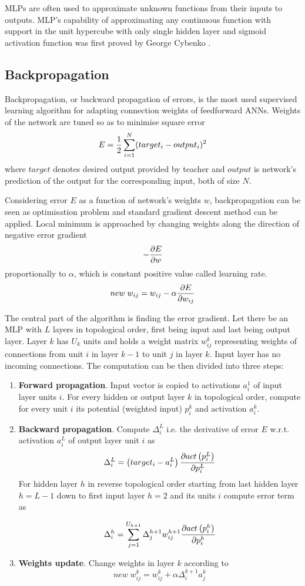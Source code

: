 \documentclass[12pt,oneside]{fithesis2}
\begin{document}
MLPs are often used to approximate unknown functions from their inputs to outputs. MLP's capability of approximating any continuous function with support in the unit hypercube with only single hidden layer and sigmoid activation function was first proved by George Cybenko \cite{universal-approx-theorem}.

\subsection{Backpropagation}
Backpropagation, or backward propagation of errors, is the most used supervised learning algorithm for adapting connection weights of feedforward ANNs. Weights of the network are tuned so as to minimise square error
$$E = {1 \over 2} \sum\limits_{i=1}^{N}(target_i - output_i)^2$$
where $target$ denotes desired output provided by teacher and $output$ is network's prediction of the output for the corresponding input, both of size $N$. \par
Considering error $E$ as a function of network's weights $w$, backpropagation can be seen as optimisation problem and standard gradient descent method can be applied. Local minimum is approached by changing weights along the direction of negative error gradient 
$$-{{\partial E} \over {\partial w}}$$
proportionally to $\alpha$, which is constant positive value called learning rate.
$$new \; w_{ij} = w_{ij} - \alpha {{\partial E} \over {\partial w_{ij}}}$$

The central part of the algorithm is finding the error gradient. Let there be an MLP with $L$ layers in topological order, first being input and last being output layer. Layer $k$ has $U_k$ units and holds a weight matrix $w_{ij}^k$ representing weights of connections from unit $i$ in layer $k - 1$ to unit $j$ in layer $k$. Input layer has no incoming connections. The computation can be then divided into three steps:

\begin{enumerate}
  \item \textbf{Forward propagation}. Input vector is copied to activations $a_i^1$ of input layer units $i$. For every hidden or output layer $k$ in topological order, compute for every unit $i$ its potential (weighted input) $p_i^k$ and activation $a_i^k$.
  
  \item \textbf{Backward propagation}. Compute $\Delta^L_i$ i.e. the derivative of error $E$  w.r.t. activation $a_i^L$ of output layer unit $i$ as
  $$\Delta^L_i = \left(target_i - a^L_i\right){{\partial{act\left(p^L_i\right)}} \over {\partial p^L_i}}$$
 For hidden layer $h$ in reverse topological order starting from last hidden layer $h = L-1$ down to first input layer $h=2$ and its units $i$ compute error term as
 
  $$\Delta^h_i = \sum\limits_{j=1}^{U_{h + 1}} \Delta_{j}^{h+1}w_{ij}^{h+1} {{\partial{act\left(p^h_i\right)}} \over {\partial p^h_i}}$$
  
  \item \textbf{Weights update}. Change weights in layer $k$ according to
  $$new \; w_{ij}^k = w_{ij}^k + \alpha \Delta_i^{k+1} a_{j}^{k}$$

\end{enumerate}
\end{document}
